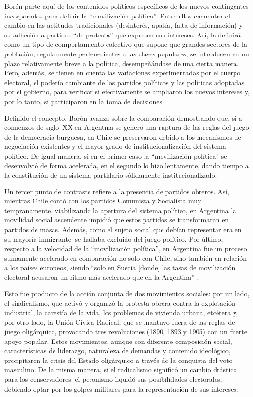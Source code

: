 Borón parte aquí de los contenidos políticos específicos de los nuevos contingentes incorporados para definir la \enquote{movilización política}. Entre ellos encuentra el cambio en las actitudes tradicionales (desinterés, apatía, falta de información) y su adhesión a partidos \enquote{de protesta} que expresen sus intereses. Así, la definirá como un tipo de comportamiento colectivo que supone que grandes sectores de la población, regularmente pertenecientes a las clases populares, se introducen en un plazo relativamente breve a la política, desempeñándose de una cierta manera. Pero, además, se tienen en cuenta las variaciones experimentadas por el cuerpo electoral, el poderío cambiante de los partidos políticos y las políticas adoptadas por el gobierno, para verificar si efectivamente se ampliaron los nuevos intereses y, por lo tanto, si participaron en la toma de decisiones.

Definido el concepto, Borón avanza sobre la comparación demostrando que, si a comienzos de siglo~XX en Argentina se generó una ruptura de las reglas del juego de la democracia burguesa, en Chile se preservaron debido a los mecanismos de negociación existentes y el mayor grado de institucionalización del sistema político. De igual manera, si en el primer caso la \enquote{movilización política} se desenvolvió de forma acelerada, en el segundo lo hizo lentamente, dando tiempo a la constitución de un sistema partidario sólidamente institucionalizado.

Un tercer punto de contraste refiere a la presencia de partidos obreros. Así, mientras Chile contó con los partidos Comunista y Socialista muy tempranamente, viabilizando la apertura del sistema político, en Argentina la movilidad social ascendente impidió que estos partidos se transformaran en partidos de masas. Además, como el sujeto social que debían representar era en su mayoría inmigrante, se hallaba excluido del juego político. Por último, respecto a la velocidad de la \enquote{movilización política}, en Argentina fue un proceso sumamente acelerado en comparación no solo con Chile, sino también en relación a los países europeos, siendo \enquote{solo en Suecia [donde] las tasas de movilización electoral acusaron un ritmo más acelerado que en la Argentina} \parencite[232]{1573-BORON1972}.

Esto fue producto de la acción conjunta de dos movimientos sociales: por un lado, el sindicalismo, que activó y organizó la protesta obrera contra la explotación industrial, la carestía de la vida, los problemas de vivienda urbana, etcétera y, por otro lado, la Unión Cívica Radical, que se mantuvo fuera de las reglas de juego oligárquico, provocando tres revoluciones (1890, 1893 y 1905) con un fuerte apoyo popular. Estos movimientos, aunque con diferente composición social, características de liderazgo, naturaleza de demandas y contenido ideológico, precipitaron la crisis del Estado oligárquico a través de la conquista del voto masculino. De la misma manera, si el radicalismo significó un cambio drástico para los conservadores, el peronismo liquidó sus posibilidades electorales, debiendo optar por los golpes militares para la representación de sus intereses.

